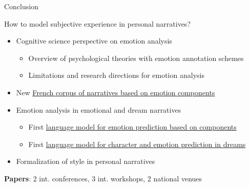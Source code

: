 \documentclass[handout,10pt]{beamer}
\begin{document}
\begin{frame}{Conclusion}

How to model subjective experience in personal narratives?

\vspace{0.25cm}
\begin{itemize}
  \setlength{\itemsep}{1.0em}
  \item Cognitive science perspective on emotion analysis
  \begin{itemize}\footnotesize
    \setlength{\itemsep}{0.5em}
    \item Overview of psychological theories with emotion annotation schemes
    \item Limitations and research directions for emotion analysis
  \end{itemize}
  \item New \href{https://huggingface.co/datasets/gustavecortal/FrenchEmotionalNarratives}{French corpus of narratives based on emotion components}
  \item Emotion analysis in emotional and dream narratives 
  \begin{itemize}\footnotesize
    \setlength{\itemsep}{0.5em}
    \item First \href{https://huggingface.co/gustavecortal/distilcamembert-cae-all}{language model for emotion prediction based on components}
    \item First \href{https://huggingface.co/gustavecortal/dream-t5}{language model for character and emotion prediction in dreams}
  \end{itemize}
  \item Formalization of style in personal narratives
\end{itemize}

\vspace{0.5cm}


{\small
\textbf{Papers}: 2 int. conferences, 3 int. workshops, 2 national venues


}

\end{frame}
\end{document}

